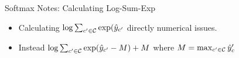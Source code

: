 \documentclass{beamer}
\begin{document}
\begin{frame}{Softmax Notes: Calculating Log-Sum-Exp}
  \begin{itemize}
  \item Calculating $\log \sum_{c' \in \mathcal{C}} \exp(\hat{y}_{c'}$ directly numerical issues.
  \item Instead $\log \sum_{c' \in \mathcal{C}} \exp(\hat{y}_{c'} - M) + M$ where $M = \max_{c'\in\mathcal{C}} \hat{y}_c'$
  \end{itemize}
\end{frame}
\end{document}
